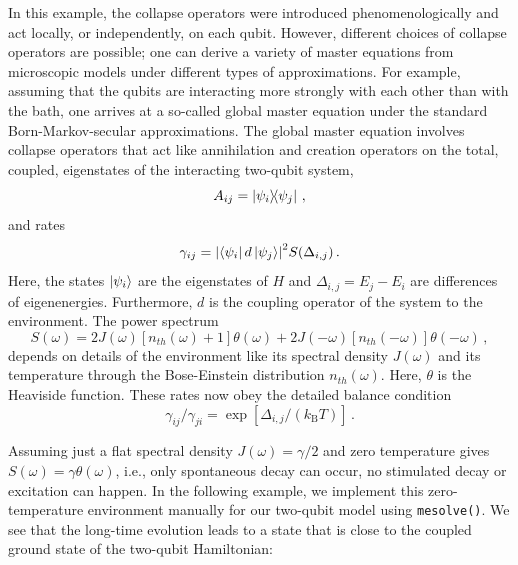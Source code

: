 \documentclass[preprint,3p,sort&compress]{elsarticle}
\def\code#1{\texttt{#1}}
\begin{document}
In this example, the collapse operators were introduced phenomenologically and act locally, or independently, on each qubit.  However, different choices of collapse operators are possible; one can derive a variety of master equations from microscopic models under different types of approximations. For example, assuming that the qubits are interacting more strongly with each other than with the bath, one arrives at a so-called global master equation under the standard Born-Markov-secular approximations. The global master equation involves collapse operators that act like annihilation and creation operators on the total, coupled, eigenstates of the interacting two-qubit system, 
\begin{equation}
A_{ij} = \ketbra{\psi_i}{\psi_j} \, ,
\end{equation}
and rates
\begin{equation}
\gamma_{ij} =\abs{ \bra{\psi_i} d \ket{\psi_j} }^2 S(\Delta_{i,j})\, .
\end{equation}
Here, the states $\ket{\psi_i}$ are the eigenstates of $H$ and $\Delta_{i,j} = E_j-E_i$ are differences of eigenenergies. Furthermore, $d$ is the coupling operator of the system to the environment.  The power spectrum 
\begin{equation} \label{eq:power_spectrum_definition}
S(\omega) = 2J(\omega) [ n_{th}(\omega)+1 ] \theta(\omega) + 2J(-\omega) [n_{th}(-\omega)]\theta(-\omega) \, , 
\end{equation}
depends on details of the environment like its spectral density $J(\omega)$ and its temperature through the Bose-Einstein distribution $n_{th}(\omega)$. Here, $\theta$ is the Heaviside function. These rates now obey the detailed balance condition
\begin{equation}
    \gamma_{ij} / \gamma_{ji} = \exp[ \Delta_{i,j} / (k_\mathrm{B} T)]\, .
\end{equation}

Assuming just a flat spectral density $J(\omega) = \gamma/2 $ and zero temperature gives $S(\omega) = \gamma \theta(\omega)$, i.e., only spontaneous decay can occur, no stimulated decay or excitation can happen.
In the following example, we implement this zero-temperature environment manually for our two-qubit model using \code{mesolve()}. We see that the long-time evolution leads to a state that is close to the coupled ground state of the two-qubit Hamiltonian:
\end{document}
